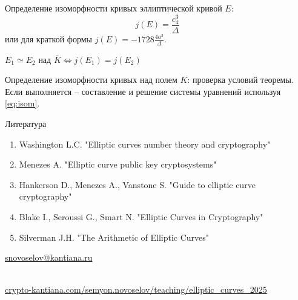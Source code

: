 \documentclass{beamer}
\begin{document}
\begin{frame}{Определение изоморфности кривых}
 эллиптической кривой $E$:
\[
j(E) = \frac{c_4^3}{\Delta}
\] или для краткой формы  $j(E) = -1728 \frac{4a^3}{\Delta}$.
\begin{center}
    \begin{tcolorbox}[enhanced,hbox,colback=title-and-section-color!5,colframe=title-and-section-color!120,title=Теорема,center title]
        \begin{varwidth}{\textwidth}
            \begin{center}
                $E_1 \simeq E_2$ над $\overline{K} \iff j(E_1)=j(E_2)$
            \end{center}
        \end{varwidth}
    \end{tcolorbox}	
\end{center}
Определение изоморфности кривых над полем $K$: проверка условий теоремы. Если выполняется -- составление и решение системы уравнений используя \eqref{eq:isom}.
\end{frame}

\begin{frame}{Литература}
\begin{enumerate}
    \item Washington L.C. "Elliptic curves number theory and cryptography"%
    \item Menezes A. "Elliptic curve public key cryptosystems"
    \item Hankerson D., Menezes A., Vanstone S. "Guide to elliptic curve cryptography"
    \item Blake I., Seroussi G., Smart N. "Elliptic Curves in Cryptography"
    \item Silverman J.H. "The Arithmetic of Elliptic Curves"%
\end{enumerate}


\begin{center}
    \begin{tcolorbox}[enhanced,hbox,colback=block-green-color-bg,colframe=subsection-color!120,title=Контакты,center title]
        \begin{varwidth}{\textwidth}
            \begin{center}
                \href{mailto:snovoselov@kantiana.ru}{snovoselov@kantiana.ru}
            \end{center}
        \end{varwidth}
    \end{tcolorbox}	
\end{center}

\\
{\footnotesize
    \href{https://crypto-kantiana.com/semyon.novoselov/teaching/elliptic_curves_2025}{crypto-kantiana.com/semyon.novoselov/teaching/elliptic\_curves\_2025}
}
\end{frame}
\end{document}
